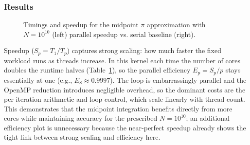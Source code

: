 \subsubsection{Results}

\begin{figure}[H]
    \hfill
    \vspace{2em}
    \caption{Timings and speedup for the midpoint $\pi$ approximation with $N = 10^{10}$ (left) parallel speedup vs. serial baseline (right).}
    \label{fig:pi_speedup}
\end{figure}

Speedup ($S_p = T_1/T_p$) captures strong scaling: how much faster the fixed workload runs as threads increase. In this kernel each time the number of cores doubles the runtime halves (Table~\ref{fig:pi_speedup}), so the parallel efficiency $E_p = S_p/p$ stays essentially at one (e.g., $E_8 \approx 0.9997$). The loop is embarrassingly parallel and the OpenMP reduction introduces negligible overhead, so the dominant costs are the per-iteration arithmetic and loop control, which scale linearly with thread count. This demonstrates that the midpoint integration benefits directly from more cores while maintaining accuracy for the prescribed $N = 10^{10}$; an additional efficiency plot is unnecessary because the near-perfect speedup already shows the tight link between strong scaling and efficiency here.
